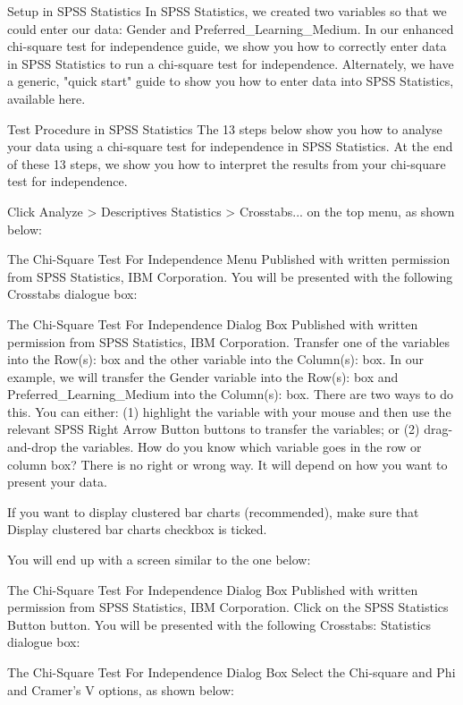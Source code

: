 Setup in SPSS Statistics
In SPSS Statistics, we created two variables so that we could enter our data: Gender and Preferred_Learning_Medium. In our enhanced chi-square test for independence guide, we show you how to correctly enter data in SPSS Statistics to run a chi-square test for independence. Alternately, we have a generic, "quick start" guide to show you how to enter data into SPSS Statistics, available here.



Test Procedure in SPSS Statistics
The 13 steps below show you how to analyse your data using a chi-square test for independence in SPSS Statistics. At the end of these 13 steps, we show you how to interpret the results from your chi-square test for independence.

Click Analyze > Descriptives Statistics > Crosstabs... on the top menu, as shown below:

The Chi-Square Test For Independence Menu
Published with written permission from SPSS Statistics, IBM Corporation.
You will be presented with the following Crosstabs dialogue box:

The Chi-Square Test For Independence Dialog Box
Published with written permission from SPSS Statistics, IBM Corporation.
Transfer one of the variables into the Row(s): box and the other variable into the Column(s): box. In our example, we will transfer the Gender variable into the Row(s): box and Preferred_Learning_Medium into the Column(s): box. There are two ways to do this. You can either: (1) highlight the variable with your mouse and then use the relevant SPSS Right Arrow Button buttons to transfer the variables; or (2) drag-and-drop the variables. How do you know which variable goes in the row or column box? There is no right or wrong way. It will depend on how you want to present your data.

If you want to display clustered bar charts (recommended), make sure that Display clustered bar charts checkbox is ticked.

You will end up with a screen similar to the one below:

The Chi-Square Test For Independence Dialog Box
Published with written permission from SPSS Statistics, IBM Corporation.
Click on the SPSS Statistics Button button. You will be presented with the following Crosstabs: Statistics dialogue box:

The Chi-Square Test For Independence Dialog Box
Select the Chi-square and Phi and Cramer's V options, as shown below:

